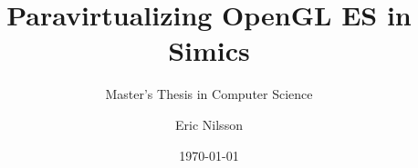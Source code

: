 
\title{Paravirtualizing OpenGL ES in Simics}
\subtitle{Master's Thesis in Computer Science}
\author{Eric Nilsson}
\date{\today} %

\begin{frame}
	\titlepage
\end{frame}